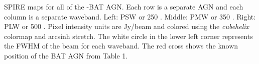 \label{fig:example_maps} SPIRE maps for all of the \herschel-BAT AGN. Each row is a separate AGN and each column is a separate waveband. Left: PSW or 250 \um. Middle: PMW or 350 \um. Right: PLW or 500 \um. Pixel intensity units are Jy/beam and colored using the \textit{cubehelix} colormap \citep{Green:2011sp} and arcsinh stretch. The white circle in the lower left corner represents the FWHM of the beam for each waveband. The red cross shows the known position of the BAT AGN from Table 1.